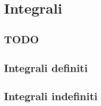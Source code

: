
\chapter{Integrali}

\section{TODO}

\section{Integrali definiti}
\label{sec:01_esponenziali}

% 

\section{Integrali indefiniti}
\label{sec:02_logaritmiche}


